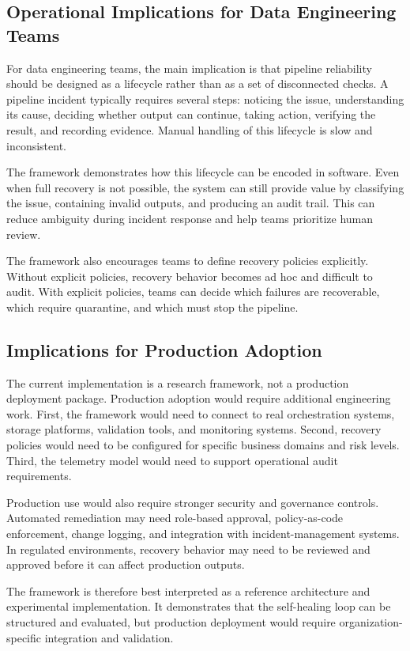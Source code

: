 \subsection{Operational Implications for Data Engineering Teams}

For data engineering teams, the main implication is that pipeline reliability should be designed as a lifecycle rather than as a set of disconnected checks. A pipeline incident typically requires several steps: noticing the issue, understanding its cause, deciding whether output can continue, taking action, verifying the result, and recording evidence. Manual handling of this lifecycle is slow and inconsistent.

The framework demonstrates how this lifecycle can be encoded in software. Even when full recovery is not possible, the system can still provide value by classifying the issue, containing invalid outputs, and producing an audit trail. This can reduce ambiguity during incident response and help teams prioritize human review.

The framework also encourages teams to define recovery policies explicitly. Without explicit policies, recovery behavior becomes ad hoc and difficult to audit. With explicit policies, teams can decide which failures are recoverable, which require quarantine, and which must stop the pipeline.

\subsection{Implications for Production Adoption}

The current implementation is a research framework, not a production deployment package. Production adoption would require additional engineering work. First, the framework would need to connect to real orchestration systems, storage platforms, validation tools, and monitoring systems. Second, recovery policies would need to be configured for specific business domains and risk levels. Third, the telemetry model would need to support operational audit requirements.

Production use would also require stronger security and governance controls. Automated remediation may need role-based approval, policy-as-code enforcement, change logging, and integration with incident-management systems. In regulated environments, recovery behavior may need to be reviewed and approved before it can affect production outputs.

The framework is therefore best interpreted as a reference architecture and experimental implementation. It demonstrates that the self-healing loop can be structured and evaluated, but production deployment would require organization-specific integration and validation.

